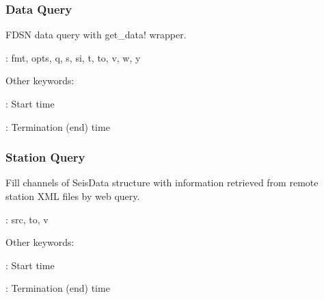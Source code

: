 \documentclass[letterpaper,11pt,english]{sphinxmanual}
\begin{document}
\subsubsection{Data Query}
\label{\detokenize{src/Web/webclients:data-query}}

\begin{fulllineitems}
\end{fulllineitems}



\begin{fulllineitems}
\end{fulllineitems}


FDSN data query with get\_data! wrapper.

\begin{DUlineblock}{0em}
\item[] {\hyperref[\detokenize{src/Appendices/keywords:dkw}]{}}: fmt, opts, q, s, si, t, to, v, w, y
\item[] Other keywords:
\item[] : Start time
\item[] : Termination (end) time
\end{DUlineblock}


\subsubsection{Station Query}
\label{\detokenize{src/Web/webclients:station-query}}

\begin{fulllineitems}
\end{fulllineitems}



\begin{fulllineitems}
\end{fulllineitems}


Fill channels  of SeisData structure  with information retrieved from
remote station XML files by web query.

\begin{DUlineblock}{0em}
\item[] {\hyperref[\detokenize{src/Appendices/keywords:dkw}]{}}: src, to, v
\item[] Other keywords:
\item[] : Start time
\item[] : Termination (end) time
\end{DUlineblock}
\end{document}
